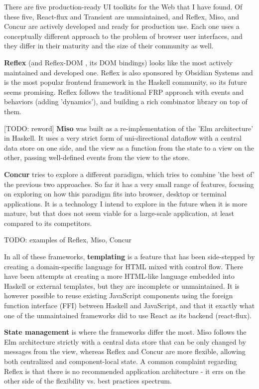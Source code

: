 \documentclass[english,odsaz]{fitthesis}
\begin{document}
There are five production-ready UI toolkits for the Web that I have found. Of
these five, React-flux and Transient are unmaintained, and Reflex, Miso, and
Concur are actively developed and ready for production use. Each one uses a
conceptually different approach to the problem of browser user interfaces, and
they differ in their maturity and the size of their community as well.

\textbf{Reflex} \cite{reflex} (and Reflex-DOM \cite{reflex-dom}, its DOM bindings) looks like
the most actively maintained and developed one. Reflex is also sponsored by
Obsidian Systems \cite{obsidian} and is the most popular frontend framework in the
Haskell community, so its future seems promising. Reflex follows the traditional
FRP approach with events and behaviors (adding 'dynamics'), and
building a rich combinator library on top of them.

[TODO: reword] \textbf{Miso} \cite{miso} was built as a re-implementation of the 'Elm architecture' in
Haskell. It uses a very strict form of uni-directional dataflow with a central
data store on one side, and the view as a function from the state to a view
on the other, passing well-defined events from the view to the store.

\textbf{Concur} \cite{concur} tries to explore a different paradigm, which tries to combine
'the best of' the previous two approaches. So far it has a very small
range of features, focusing on exploring on how this paradigm fits into browser,
desktop or terminal applications. It is a technology I intend to explore in the
future when it is more mature, but that does not seem viable for a large-scale
application, at least compared to its competitors.

TODO: examples of Reflex, Miso, Concur

In all of these frameworks, \textbf{templating} is a feature that has been side-stepped
by creating a domain-specific language for HTML mixed with control flow. There
have been attempts at creating a more HTML-like language embedded into Haskell
or external templates, but they are incomplete or unmaintained. It is however
possible to reuse existing JavaScript components using the foreign function
interface (FFI) between Haskell and JavaScript, and that it exactly what one of
the unmaintained frameworks did to use React as its backend (react-flux).

\textbf{State management} is where the frameworks differ the most. Miso follows the Elm
architecture strictly with a central data store that can be only changed by
messages from the view, whereas Reflex and Concur are more flexible, allowing
both centralized and component-local state. A common complaint regarding Reflex
is that there is no recommended application architecture - it errs on the
other side of the flexibility vs. best practices spectrum.
\end{document}
